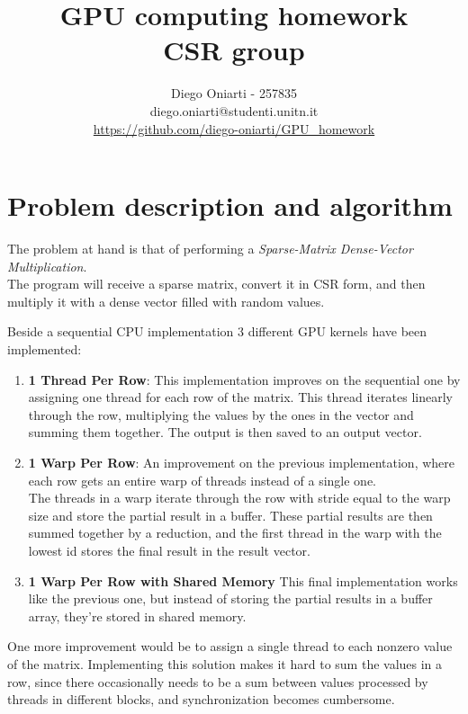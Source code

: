 \documentclass{article}
\title{
    GPU computing homework\\
\large CSR group}
\author{Diego Oniarti - 257835 \\ diego.oniarti@studenti.unitn.it \\ \url{https://github.com/diego-oniarti/GPU_homework}}
\date{}
\begin{document}
\maketitle

\section{Problem description and algorithm}
The problem at hand is that of performing a \textit{Sparse-Matrix Dense-Vector Multiplication}.\\The program will receive a sparse matrix, convert it in CSR form, and then multiply it with a dense vector filled with random values.

Beside a sequential CPU implementation 3 different GPU kernels have been implemented:
\begin{enumerate}
    \item \textbf{1 Thread Per Row}: This implementation improves on the sequential one by assigning one thread for each row of the matrix. This thread iterates linearly through the row, multiplying the values by the ones in the vector and summing them together. The output is then saved to an output vector.
    \item \textbf{1 Warp Per Row}: An improvement on the previous implementation, where each row gets an entire warp of threads instead of a single one.\\
        The threads in a warp iterate through the row with stride equal to the warp size and store the partial result in a buffer. These partial results are then summed together by a reduction, and the first thread in the warp with the lowest id stores the final result in the result vector.
    \item \textbf{1 Warp Per Row with Shared Memory} This final implementation works like the previous one, but instead of storing the partial results in a buffer array, they're stored in shared memory.
\end{enumerate}
One more improvement would be to assign a single thread to each nonzero value of the matrix. Implementing this solution makes it hard to sum the values in a row, since there occasionally needs to be a sum between values processed by threads in different blocks, and synchronization becomes cumbersome.
\end{document}
